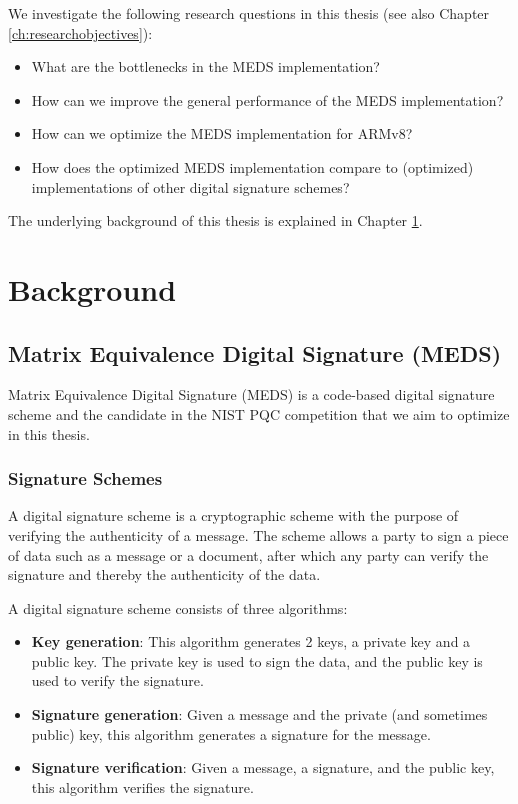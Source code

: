 \documentclass[11pt,a4paper]{report}
\begin{document}
We investigate the following research questions in this thesis (see also Chapter \ref{ch:researchobjectives}):
\begin{itemize}
  \item What are the bottlenecks in the MEDS implementation?
  \item How can we improve the general performance of the MEDS implementation?
  \item How can we optimize the MEDS implementation for ARMv8?
  \item How does the optimized MEDS implementation compare to (optimized) implementations of other digital signature schemes?
\end{itemize}

The underlying background of this thesis is explained in Chapter \ref{ch:background}.

\chapter{Background}
\label{ch:background}


\section{Matrix Equivalence Digital Signature (MEDS)}
\label{sec:meds}
Matrix Equivalence Digital Signature (MEDS) \cite{chou2023take} is a code-based digital signature scheme and the candidate in the NIST PQC competition that we aim to optimize in this thesis.

\subsection{Signature Schemes}
\label{sec:signatureschemes}
A digital signature scheme is a cryptographic scheme with the purpose of verifying the authenticity of a message. The scheme allows a party to sign a piece of data such as a message or a document, after which any party can verify the signature and thereby the authenticity of the data.

A digital signature scheme consists of three algorithms:
\begin{itemize}
  \item \textbf{Key generation}: This algorithm generates 2 keys, a private key and a public key. The private key is used to sign the data, and the public key is used to verify the signature.
  \item \textbf{Signature generation}: Given a message and the private (and sometimes public) key, this algorithm generates a signature for the message.
  \item \textbf{Signature verification}: Given a message, a signature, and the public key, this algorithm verifies the signature.
\end{itemize}
\end{document}

